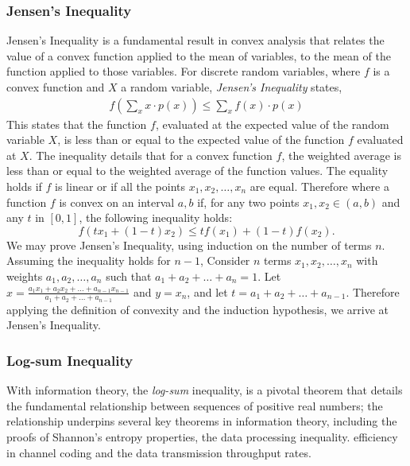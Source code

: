 \documentclass[12pt]{article}
\begin{document}
		\subsubsection{Jensen's Inequality}
		Jensen's Inequality is a fundamental result in convex analysis that relates the value of a convex function applied to the mean of variables, to the mean of the function applied to those variables.  For discrete random variables, where $f$ is a convex function and $X$ a random variable, \emph{Jensen's Inequality} states,
		\begin{align}
			f\left(\sum_{x} x \cdot p(x)\right) \leq \sum_{x} f(x) \cdot p(x)
		\end{align}
		This states that the function \( f \), evaluated at the expected value of the random variable \( X \), is less than or equal to the expected value of the function \( f \) evaluated at \( X \). The inequality details  that for a convex function \(f\), the weighted average is less than or equal to the weighted average of the function values. The equality holds if \(f\) is linear or if all the points \(x_1, x_2, \ldots, x_n\) are equal. Therefore where a function \(f\) is convex on an interval \(a, b\) if, for any two points \(x_1, x_2 \in (a, b) \) and any \(t\) in \([0, 1]\), the following inequality holds:
		\[
		f(tx_1 + (1-t)x_2) \leq tf(x_1) + (1-t)f(x_2).
		\]
		We may prove Jensen's Inequality, using  induction on the number of terms \(n\).  Assuming the inequality holds for \(n-1\), Consider \(n\) terms \(x_1, x_2, \ldots, x_n\) with weights \(a_1, a_2, \ldots, a_n\) such that \(a_1 + a_2 + \ldots + a_n = 1\). Let \(x = \frac{a_1x_1 + a_2x_2 + \ldots + a_{n-1}x_{n-1}}{a_1 + a_2 + \ldots + a_{n-1}}\) and \(y = x_n\), and let \(t = a_1 + a_2 + \ldots + a_{n-1}\). Therefore applying the definition of convexity and the induction hypothesis, we arrive at Jensen's Inequality.
		\subsubsection{Log-sum Inequality}
		With information theory, the \emph{log-sum} inequality, is a pivotal theorem that details the  fundamental relationship between sequences of positive real numbers; the relationship underpins several key theorems in information theory, including the proofs of Shannon's entropy properties, the data processing inequality. efficiency in channel coding and the data transmission throughput rates. 
		
\end{document}
